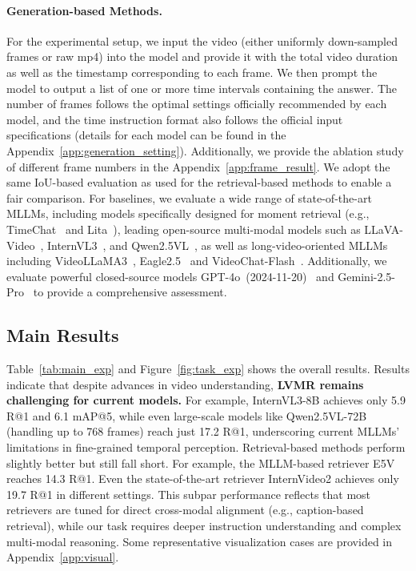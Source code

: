 \documentclass{article}
\begin{document}
\paragraph{Generation-based Methods.}
For the experimental setup, we input the video (either uniformly down-sampled frames or raw mp4) into the model and provide it with the total video duration as well as the timestamp corresponding to each frame. We then prompt the model to output a list of one or more time intervals containing the answer. The number of frames follows the optimal settings officially recommended by each model, and the time instruction format also follows the official input specifications (details for each model can be found in the Appendix~\ref{app:generation_setting}). Additionally, we provide the ablation study of different frame numbers in the Appendix~\ref{app:frame_result}. We adopt the same IoU-based evaluation as used for the retrieval-based methods to enable a fair comparison. For baselines, we evaluate a wide range of state-of-the-art MLLMs, including models specifically designed for moment retrieval (e.g., TimeChat~\cite{ren2024timechat} and Lita~\cite{huang2024lita}), leading open-source multi-modal models such as LLaVA-Video~\cite{zhang2024llavavideo}, InternVL3~\cite{zhu2025internvl3}, and Qwen2.5VL~\cite{bai2025qwen25vl}, as well as long-video-oriented MLLMs including VideoLLaMA3~\cite{zhang2025videollama3frontiermultimodal}, Eagle2.5~\cite{chen2025eagle25boostinglongcontext} and VideoChat-Flash~\cite{li2025videochatflash}. Additionally, we evaluate powerful closed-source models GPT-4o~(2024-11-20)~\cite{openai2023gpt4} and Gemini-2.5-Pro~\cite{Kavukcuoglu2025gemini2.5} to provide a comprehensive assessment. 










\subsection{Main Results}
Table~\ref{tab:main_exp} and Figure~\ref{fig:task_exp} shows the overall results. Results indicate that despite advances in video understanding,  \textbf{LVMR remains challenging for current models.}  For example, InternVL3-8B achieves only 5.9 R@1 and 6.1 mAP@5, while even large-scale models like Qwen2.5VL-72B (handling up to 768 frames) reach just 17.2 R@1, underscoring current MLLMs' limitations in fine-grained temporal perception. Retrieval-based methods perform slightly better but still fall short. For example, the MLLM-based retriever E5V reaches 14.3 R@1. Even the state-of-the-art retriever InternVideo2 achieves only 19.7 R@1 in different settings. This subpar performance reflects that most retrievers are tuned for direct cross-modal alignment (e.g., caption-based retrieval), while our task requires deeper instruction understanding and complex multi-modal reasoning. Some representative visualization cases are provided in Appendix~\ref{app:visual}.
\end{document}
